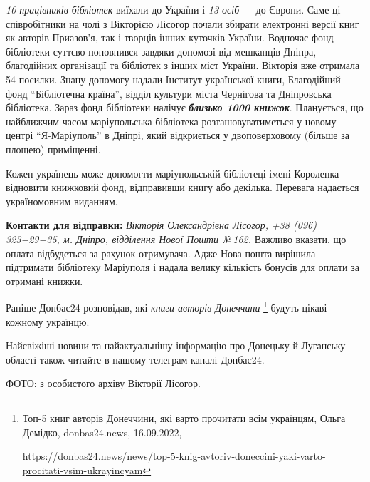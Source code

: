 \emph{10 працівників бібліотек} виїхали до України і \emph{13 осіб} — до Європи. Саме ці
співробітники на чолі з Вікторією Лісогор почали збирати електронні версії книг
як авторів Приазов'я, так і творців інших куточків України. Водночас фонд
бібліотеки суттєво поповнився завдяки допомозі від мешканців Дніпра,
благодійних організації та бібліотек з інших міст України. Вікторія вже
отримала 54 посилки. Знану допомогу надали Інститут української книги,
Благодійний фонд \enquote{Бібліотечна країна}, відділ культури міста Чернігова та
Дніпровська бібліотека. Зараз фонд бібліотеки налічує \emph{\textbf{близько 1000 книжок}}.
Планується, що найближчим часом маріупольська бібліотека розташовуватиметься у
новому центрі \enquote{Я-Маріуполь} в Дніпрі, який відкриється у двоповерховому (більше
за площею) приміщенні.

Кожен українець може допомогти маріупольській бібліотеці імені Короленка
відновити книжковий фонд, відправивши книгу або декілька. Перевага надається
україномовним виданням.

\textbf{Контакти для відправки:} \emph{Вікторія Олександрівна Лісогор, +38 (096) 323−29−35, м.
Дніпро, відділення Нової Пошти № 162.} Важливо вказати, що оплата відбудеться за
рахунок отримувача. Адже Нова пошта вирішила підтримати бібліотеку Маріуполя і
надала велику кількість бонусів для оплати за отримані книжки.

Раніше Донбас24 розповідав, які \emph{книги авторів Донеччини}%
\footnote{Топ-5 книг авторів Донеччини, які варто прочитати всім українцям, Ольга Демідко, donbas24.news, 16.09.2022, \par%
\url{https://donbas24.news/news/top-5-knig-avtoriv-doneccini-yaki-varto-procitati-vsim-ukrayincyam}%
}
будуть цікаві кожному українцю.

Найсвіжіші новини та найактуальнішу інформацію про Донецьку й Луганську області
також читайте в нашому телеграм-каналі Донбас24.

ФОТО: з особистого архіву Вікторії Лісогор.

